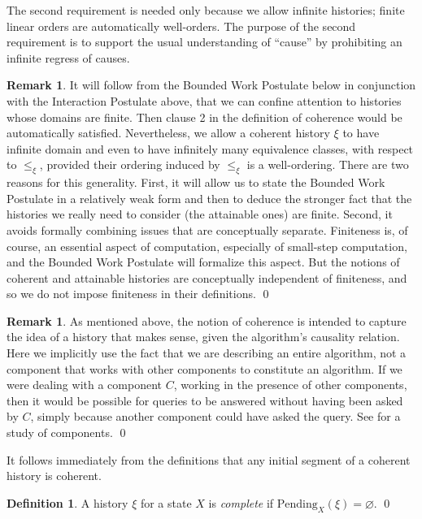 \documentclass{LMCS}
\theoremstyle{definition}
\newtheorem{df}[thm]{Definition}
\newtheorem{rmk}[thm]{Remark}
\newcommand{\emp}{\varnothing} \renewcommand{\phi}{\varphi}
\begin{document}
The second requirement is needed only because we allow infinite
histories; finite linear orders are automatically well-orders.  The
purpose of the second requirement is to support the usual
understanding of ``cause'' by prohibiting an infinite regress of
causes.

\begin{rmk}
It will follow from the Bounded Work Postulate below in conjunction
with the Interaction Postulate above, that we can confine attention
to histories whose domains are finite.  Then clause 2 in the
definition of coherence would be automatically satisfied.
Nevertheless, we allow a coherent history $\xi$ to have infinite
domain and even to have infinitely many equivalence classes, with
respect to $\leq_\xi$, provided their ordering induced by $\leq_\xi$
is a well-ordering. There are two reasons for this generality.
First, it will allow us to state the Bounded Work Postulate in a
relatively weak form and then to deduce the stronger fact that the
histories we really need to consider (the attainable ones) are
finite.  Second, it avoids formally combining issues that are
conceptually separate. Finiteness is, of course, an essential aspect
of computation, especially of small-step computation, and the
Bounded Work Postulate will formalize this aspect.  But the notions
of coherent and attainable histories are conceptually independent of
finiteness, and so we do not impose finiteness in their definitions.
\qed\end{rmk}

\begin{rmk}   \label{cpt1}
  As mentioned above, the notion of coherence is intended to capture
  the idea of a history that makes sense, given the algorithm's
  causality relation.  Here we implicitly use the fact that we are
  describing an entire algorithm, not a component that works with
  other components to constitute an algorithm.  If we were dealing
  with a component $C$, working in the presence of other components,
  then it would be possible for queries to be answered without having
  been asked by $C$, simply because another component could have asked
  the query.  See \cite{composite} for a study of components.
\qed\end{rmk}

It follows immediately from the definitions that any initial segment
of a coherent history is coherent.

\begin{df}
A history $\xi$ for a state $X$ is \emph{complete} if
$\text{Pending}_X(\xi)=\emp$.
\qed\end{df}
\end{document}
